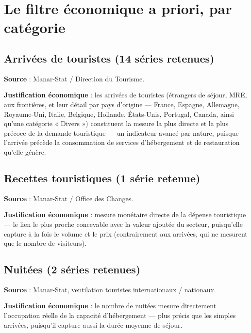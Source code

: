 \documentclass[11pt,a4paper]{article}
\begin{document}
\section{Le filtre économique a priori, par catégorie}

\subsection{Arrivées de touristes (14 séries retenues)}

\textbf{Source} : Manar-Stat / Direction du Tourisme.

\textbf{Justification économique} : les arrivées de touristes (étrangers de séjour, MRE, aux frontières, et leur détail par pays d'origine --- France, Espagne, Allemagne, Royaume-Uni, Italie, Belgique, Hollande, États-Unis, Portugal, Canada, ainsi qu'une catégorie « Divers ») constituent la mesure la plus directe et la plus précoce de la demande touristique --- un indicateur avancé par nature, puisque l'arrivée précède la consommation de services d'hébergement et de restauration qu'elle génère.

\subsection{Recettes touristiques (1 série retenue)}

\textbf{Source} : Manar-Stat / Office des Changes.

\textbf{Justification économique} : mesure monétaire directe de la dépense touristique --- le lien le plus proche concevable avec la valeur ajoutée du secteur, puisqu'elle capture à la fois le volume et le prix (contrairement aux arrivées, qui ne mesurent que le nombre de visiteurs).

\subsection{Nuitées (2 séries retenues)}

\textbf{Source} : Manar-Stat, ventilation touristes internationaux / nationaux.

\textbf{Justification économique} : le nombre de nuitées mesure directement l'occupation réelle de la capacité d'hébergement --- plus précis que les simples arrivées, puisqu'il capture aussi la durée moyenne de séjour.
\end{document}
